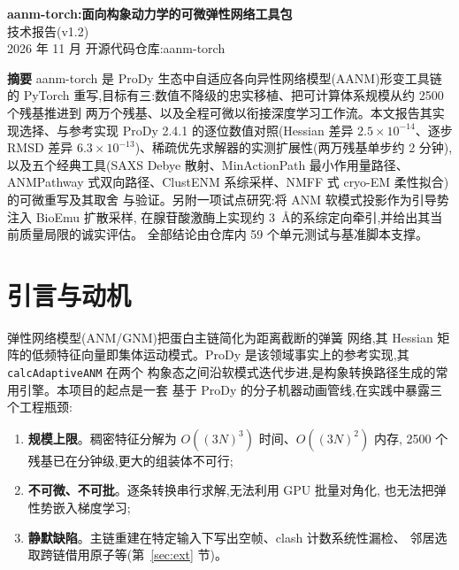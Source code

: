 \documentclass[11pt]{article}
\begin{document}
\begin{center}
{\LARGE\bfseries aanm-torch:面向构象动力学的可微弹性网络工具包}\\[0.8em]
{\large 技术报告(v1.2)}\\[0.5em]
{2026 年 11 月 \quad 开源代码仓库:aanm-torch}
\end{center}

\vspace{0.5em}
\noindent\textbf{摘要}\quad
aanm-torch 是 ProDy 生态中自适应各向异性网络模型(AANM)形变工具链的 PyTorch
重写,目标有三:数值不降级的忠实移植、把可计算体系规模从约 2500 个残基推进到
两万个残基、以及全程可微以衔接深度学习工作流。本文报告其实现选择、与参考实现
ProDy 2.4.1 的逐位数值对照(Hessian 差异 $2.5\times10^{-14}$、逐步 RMSD 差异
$6.3\times10^{-13}$)、稀疏优先求解器的实测扩展性(两万残基单步约 2 分钟),
以及五个经典工具(SAXS Debye 散射、MinActionPath 最小作用量路径、ANMPathway
式双向路径、ClustENM 系综采样、NMFF 式 cryo-EM 柔性拟合)的可微重写及其取舍
与验证。另附一项试点研究:将 ANM 软模式投影作为引导势注入 BioEmu 扩散采样,
在腺苷酸激酶上实现约 3~\AA 的系综定向牵引,并给出其当前质量局限的诚实评估。
全部结论由仓库内 59 个单元测试与基准脚本支撑。

\vspace{0.6em}

\section{引言与动机}

弹性网络模型(ANM/GNM)\cite{atilgan2001}把蛋白主链简化为距离截断的弹簧
网络,其 Hessian 矩阵的低频特征向量即集体运动模式。ProDy\cite{bakan2011,bakan2014}
是该领域事实上的参考实现,其 \texttt{calcAdaptiveANM}\cite{yang2009} 在两个
构象态之间沿软模式迭代步进,是构象转换路径生成的常用引擎。本项目的起点是一套
基于 ProDy 的分子机器动画管线,在实践中暴露三个工程瓶颈:

\begin{enumerate}[itemsep=1pt,topsep=2pt]
\item \textbf{规模上限}。稠密特征分解为 $O((3N)^3)$ 时间、$O((3N)^2)$ 内存,
2500 个残基已在分钟级,更大的组装体不可行;
\item \textbf{不可微、不可批}。逐条转换串行求解,无法利用 GPU 批量对角化,
也无法把弹性势嵌入梯度学习;
\item \textbf{静默缺陷}。主链重建在特定输入下写出空帧、clash 计数系统性漏检、
邻居选取跨链借用原子等(第~\ref{sec:ext} 节)。
\end{enumerate}
\end{document}
